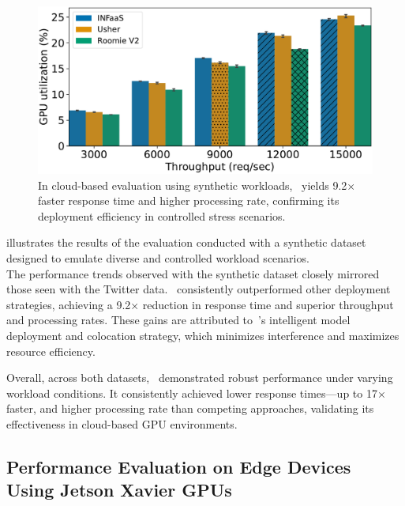 \begin{figure}
\begin{minipage}[t]{.24\linewidth}
	\end{minipage}
	\hfill
	\begin{minipage}[t]{.24\linewidth}
		\centering
		\includegraphics[width=\linewidth]{chapters/roomie/images/NvidiaA100/synthetic-all-models/gpu_utilization.pdf}
	\end{minipage}
	\caption{In cloud-based evaluation using synthetic workloads,~\roomie{} yields 9.2× faster response time and higher processing rate, confirming its deployment efficiency in controlled stress scenarios.}
	\label{fig:NvidiaA100/synthetic-all-models}
	\vspace{-3mm}
\end{figure}


 illustrates the results of the evaluation conducted with a synthetic dataset designed to emulate diverse and controlled workload scenarios.\\
The performance trends observed with the synthetic dataset closely mirrored those seen with the Twitter data.~\roomie{} consistently outperformed other deployment strategies, achieving a 9.2× reduction in response time and superior throughput and processing rates. These gains are attributed to~\roomie's intelligent model deployment and colocation strategy, which minimizes interference and maximizes resource efficiency.

Overall, across both datasets,~\roomie{} demonstrated robust performance under varying workload conditions. It consistently achieved lower response times—up to 17× faster, and higher processing rate than competing approaches, validating its effectiveness in cloud-based GPU environments.



\subsection{Performance Evaluation on Edge Devices Using Jetson Xavier GPUs}

